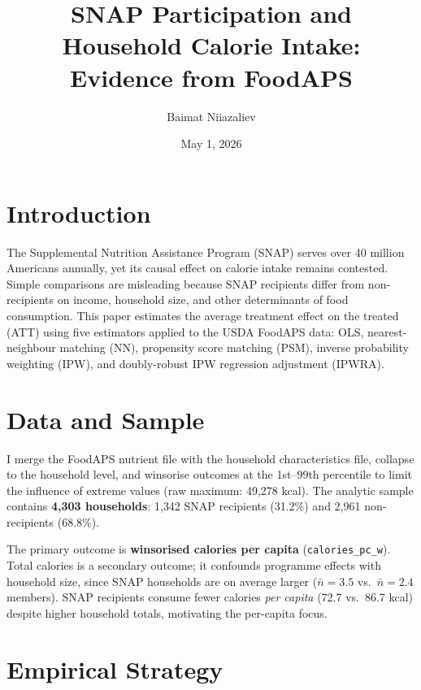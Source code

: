 \documentclass[12pt]{article}
\title{\textbf{SNAP Participation and Household Calorie Intake:\\
Evidence from FoodAPS}}
\author{Baimat Niiazaliev}
\date{May 1, 2026}
\begin{document}
\maketitle

\section{Introduction}

The Supplemental Nutrition Assistance Program (SNAP) serves over
40 million Americans annually, yet its causal effect on calorie
intake remains contested. Simple comparisons are misleading because
SNAP recipients differ from non-recipients on income, household size,
and other determinants of food consumption. This paper estimates the
average treatment effect on the treated (ATT) using five estimators
applied to the USDA FoodAPS data: OLS, nearest-neighbour matching
(NN), propensity score matching (PSM), inverse probability weighting
(IPW), and doubly-robust IPW regression adjustment (IPWRA).

\section{Data and Sample}

I merge the FoodAPS nutrient file with the household characteristics
file, collapse to the household level, and winsorise outcomes at the
1st--99th percentile to limit the influence of extreme values
(raw maximum: 49{,}278 kcal). The analytic sample contains
\textbf{4{,}303 households}: 1{,}342 SNAP recipients (31.2\%)
and 2{,}961 non-recipients (68.8\%).

The primary outcome is \textbf{winsorised calories per capita}
(\texttt{calories\_pc\_w}). Total calories is a secondary outcome;
it confounds programme effects with household size, since SNAP
households are on average larger ($\bar{n}=3.5$ vs.\ $\bar{n}=2.4$
members). SNAP recipients consume fewer calories \emph{per capita}
(72.7 vs.\ 86.7 kcal) despite higher household totals, motivating
the per-capita focus.

\section{Empirical Strategy}
\end{document}
